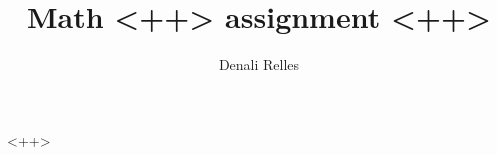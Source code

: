 \documentclass[12pt]{article}
\title{Math <++> assignment <++>}
\author{Denali Relles}
\begin{document}
\maketitle

<++>
\end{document}
